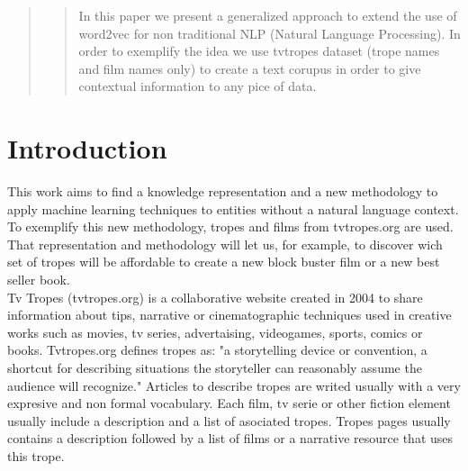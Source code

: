 \documentclass[letterpaper]{article}
\begin{document}
 
	\maketitle
	\begin{abstract}
		\begin{quote}
			In this paper we present a generalized approach to extend the use of word2vec for non traditional NLP (Natural Language Processing). In order to exemplify the idea we use tvtropes dataset (trope names and film names only) to create a text corupus in order to give contextual information to any pice of data.
		\end{quote}
	\end{abstract}
	
	
	
	
	
	\section{Introduction}
	
	
	This work aims to find a knowledge representation and a new methodology to apply machine learning techniques to entities without a natural language context. To exemplify this new methodology, tropes and films from tvtropes.org are used. That representation and methodology will let us, for example, to discover wich set of tropes will be affordable to create a new block buster film or a new best seller book.   \\
	
	Tv Tropes (tvtropes.org) is a collaborative website created in 2004 to share information about tips, narrative or cinematographic techniques used in creative works such as movies, tv series, advertaising, videogames, sports, comics or books. Tvtropes.org defines tropes as: "a storytelling device or convention, a shortcut for describing situations the storyteller can reasonably assume the audience will recognize." Articles to describe tropes are writed usually with a very expresive and non formal vocabulary. Each film, tv serie or other fiction element usually include a description and a list of asociated tropes. Tropes pages usually contains a description followed by a list of films or a narrative resource that uses this trope.\\
	
\end{document}
